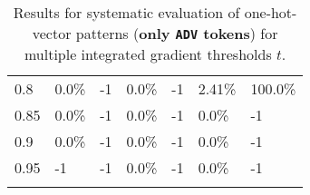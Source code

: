 \begin{table}[t]
\begin{tabular}{lllllll}
\multicolumn{1}{l|}{0.8}&  0.0\% & \multicolumn{1}{l|}{-1}& 0.0\% & \multicolumn{1}{l|}{-1}& 2.41\% & 100.0\%\\ 
\multicolumn{1}{l|}{0.85}&  0.0\% & \multicolumn{1}{l|}{-1}& 0.0\% & \multicolumn{1}{l|}{-1}& 0.0\% & -1\\ 
\multicolumn{1}{l|}{0.9}&  0.0\% & \multicolumn{1}{l|}{-1}& 0.0\% & \multicolumn{1}{l|}{-1}& 0.0\% & -1\\ 
\multicolumn{1}{l|}{0.95}&  -1 & \multicolumn{1}{l|}{-1}& 0.0\% & \multicolumn{1}{l|}{-1}& 0.0\% & -1\\ 


\\ \hline
\end{tabular}
\caption[Model Evaluation for only \texttt{ADV} tokens]{Results for systematic evaluation of one-hot-vector patterns (\textbf{only \texttt{ADV} tokens}) for multiple integrated gradient thresholds $t$.}
\label{tab:evalResultsADV}
\end{table}
	